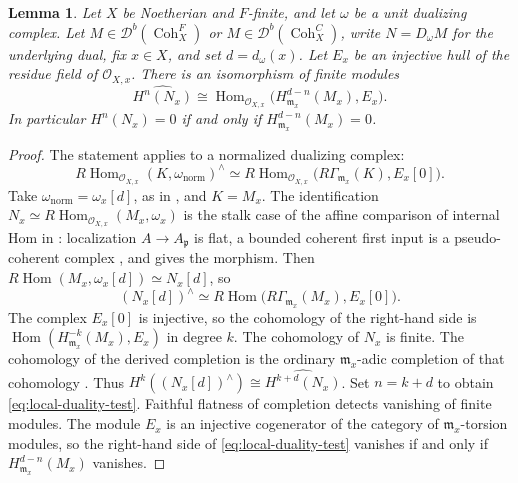 \documentclass[11pt]{amsart}
\newcommand{\cO}{\mathcal{O}}
\newcommand{\Hom}{\operatorname{Hom}}
\newcommand{\Coh}{\operatorname{{Coh}}}
\newcommand{\Db}{\mathcal D^b}
\theoremstyle{plain}
\newtheorem{lemma}[lemma]{Lemma}
\theoremstyle{definition}
\numberwithin{equation}{section}
\begin{document}
\begin{lemma}\label{lem:local-duality}
Let $X$ be Noetherian and $F$-finite, and let $\omega$ be a unit dualizing complex.
Let $M\in\Db(\Coh^F_X)$ or $M\in\Db(\Coh^C_X)$, write $N=D_\omega M$ for the underlying dual, fix $x\in X$, and set $d=d_\omega(x)$.
Let $E_x$ be an injective hull of the residue field of $\cO_{X,x}$.
There is an isomorphism of finite modules
\begin{equation}\label{eq:local-duality-test}
 \widehat{H^n(N_x)}\cong
 \Hom_{\cO_{X,x}}\bigl(H^{d-n}_{\mathfrak m_x}(M_x),E_x\bigr).
\end{equation}
In particular $H^n(N_x)=0$ if and only if $H^{d-n}_{\mathfrak m_x}(M_x)=0$.
\end{lemma}
\begin{proof}
The statement \cite[\href{https://stacks.math.columbia.edu/tag/0A84}{Tag 0A84}]{SP} applies to a normalized dualizing complex:
\[
 R\Hom_{\cO_{X,x}}(K,\omega_{\mathrm{norm}})^\wedge
 \simeq
 R\Hom_{\cO_{X,x}}\bigl(R\Gamma_{\mathfrak m_x}(K),E_x[0]\bigr).
\]
Take $\omega_{\mathrm{norm}}=\omega_x[d]$, as in , and $K=M_x$.
The identification $N_x\simeq R\Hom_{\cO_{X,x}}(M_x,\omega_x)$ is the stalk case of the affine comparison of internal Hom in : localization $A\to A_{\mathfrak p}$ is flat, a bounded coherent first input is a pseudo-coherent complex \cite[\href{https://stacks.math.columbia.edu/tag/066E}{Tag 066E(2)}]{SP}, and \cite[\href{https://stacks.math.columbia.edu/tag/0A6A}{Tag 0A6A(3)}]{SP} gives the morphism.
Then $R\Hom(M_x,\omega_x[d])\simeq N_x[d]$, so
\[
 (N_x[d])^\wedge
 \simeq
 R\Hom\bigl(R\Gamma_{\mathfrak m_x}(M_x),E_x[0]\bigr).
\]
The complex $E_x[0]$ is injective, so the cohomology of the right-hand side is
$\Hom(H^{-k}_{\mathfrak m_x}(M_x),E_x)$ in degree $k$.
The cohomology of $N_x$ is finite.
The cohomology of the derived completion is the ordinary $\mathfrak m_x$-adic completion of that cohomology \cite[\href{https://stacks.math.columbia.edu/tag/0A06}{Tag 0A06}]{SP}.
Thus $H^k((N_x[d])^\wedge)\cong\widehat{H^{k+d}(N_x)}$.
Set $n=k+d$ to obtain \eqref{eq:local-duality-test}.
Faithful flatness of completion \cite[\href{https://stacks.math.columbia.edu/tag/00MC}{Tag 00MC}]{SP} detects vanishing of finite modules.
The module $E_x$ is an injective cogenerator of the category of $\mathfrak m_x$-torsion modules, so the right-hand side of \eqref{eq:local-duality-test} vanishes if and only if $H^{d-n}_{\mathfrak m_x}(M_x)$ vanishes.
\end{proof}
\end{document}
